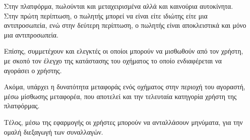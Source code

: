 \documentclass{../ol-softwaremanual}
\begin{document}
	Στην πλατφόρμα, πωλούνται και μεταχειρισμένα αλλά και καινούρια αυτοκίνητα. Στην πρώτη περίπτωση, ο πωλητής μπορεί να είναι είτε ιδιώτης είτε μια αντιπροσωπεία, ενώ στην δεύτερη περίπτωση, ο πωλητής είναι αποκλειστικά και μόνο μια αντιπροσωπεία. \hfill \break
	
	Επίσης, συμμετέχουν και ελεγκτές οι οποίοι μπορούν να μισθωθούν από τον χρήστη, με σκοπό τον έλεγχο της κατάστασης του οχήματος το οποίο ενδιαφέρεται να αγοράσει ο χρήστης. \hfill \break
	
	Ακόμα, υπάρχει η δυνατότητα μεταφοράς ενός οχήματος στην περιοχή του αγοραστή, μέσω μίσθωσης μεταφορέα, που αποτελεί και την τελευταία κατηγορία χρήστη της πλατφόρμας. \hfill \break
	
	Τέλος, μέσω της εφαρμογής οι χρήστες μπορούν να ανταλλάσουν μηνύματα, για την ομαλή διεξαγωγή των συναλλαγών.
	
	
	
	
	
	\newpage
	
	 \gr
	
	\vspace{60pt}
	
\end{document}
